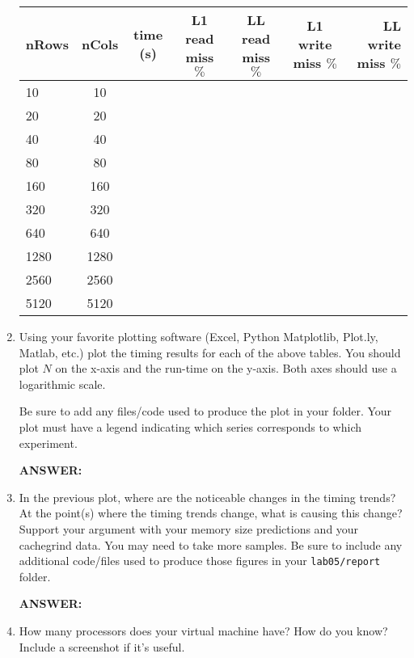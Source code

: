 \documentclass[letter]{article}
\newcommand{\mypath}[1]{\texttt{\path{#1}}}
\begin{document}
\begin{enumerate}
        \begin{center}
        \begin{tabular}{|l | c | c | c  | c | c | r |} 
        \hline
        \textbf{nRows} & \textbf{nCols} & \textbf{time (s)} & L1 read miss $\%$ & LL read miss $\%$ &  L1 write miss $\%$ & LL write miss $\%$\\ \hline
        10 & 10 & & & & &   \\
        20 & 20 & & & & &   \\
        40 & 40 & & & & &   \\
        80 & 80 & & &  & &   \\
        160 & 160 & & & & &   \\
        320 & 320 & & & & &   \\
        640 & 640 & & &  & &  \\
        1280 & 1280 & & & & &  \\ 
        2560 & 2560 & & & & &   \\
        5120 & 5120 & & & & &   \\\hline
        \end{tabular}
        \end{center}
        
        
        \item Using your favorite plotting software (Excel, Python Matplotlib, Plot.ly, Matlab, etc.) plot the timing results for each of the above tables.  You should plot $N$ on the x-axis and the run-time on the y-axis.  Both axes should use a logarithmic scale.

        Be sure to add any files/code used to produce the plot in your \mypath{lab05/report} folder.  Your plot must have a legend indicating which series corresponds to which experiment.  
        
        \textbf{ANSWER:} %
        
        \item In the previous plot, where are the noticeable changes in the timing trends?   At the point(s) where the timing trends change, what is causing this change?  Support your argument with your memory size predictions and your cachegrind data. You may need to take more samples.  Be sure to include any additional code/files used to produce those figures in your \texttt{lab05/report} folder.
        
        \textbf{ANSWER:} %
        
        \item How many processors does your virtual machine have? How do you know? Include a screenshot if it's useful. 
        

\end{enumerate}
\end{document}
